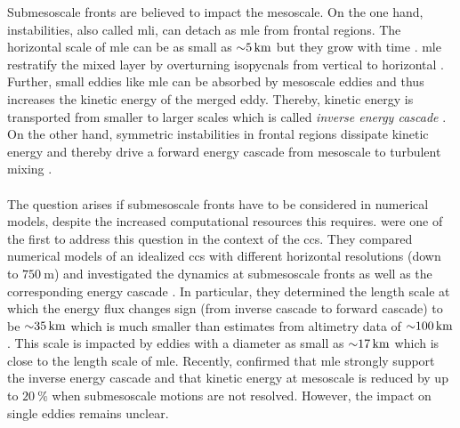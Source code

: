 Submesoscale fronts are believed to impact the mesoscale. On the one hand, instabilities, also called \ac{mli}, can detach as \ac{mle} from frontal regions. The horizontal scale of \ac{mle} can be as small as ${\sim} \SI{5}{\kilo\metre}$ but they grow with time \autocite{boccaletti-2007}. \ac{mle} restratify the mixed layer by overturning isopycnals from vertical to horizontal \autocite{foxkemper-2008-mle-param, levy-2012-physics-to-life, whitt-2017-ml-stratification}. Further, small eddies like \ac{mle} can be absorbed by mesoscale eddies and thus increases the kinetic energy of the merged eddy. Thereby, kinetic energy is transported from smaller to larger scales which is called \textit{inverse energy cascade} \autocite{sasaki-2014-mli-for-eddies, schubert-2020-subm-energy-cascade}. On the other hand, symmetric instabilities in frontal regions dissipate kinetic energy and thereby drive a forward energy cascade from mesoscale to turbulent mixing \autocite{dasaro-subm-dissipation-obs, schubert-2020-subm-energy-cascade}.\\
\\
The question arises if submesoscale fronts have to be considered in numerical models, despite the increased computational resources this requires. \textcite{capet-2008-fronts1} were one of the first to address this question in the context of the \ac{ccs}. They compared numerical models of an idealized \ac{ccs} with different horizontal resolutions (down to $\SI{750}{\metre}$) and investigated the dynamics at submesoscale fronts \autocite{capet-2008-fronts2} as well as the corresponding energy cascade \autocite{capet-2008-fronts3}. In particular, they determined the length scale at which the energy flux changes sign (from inverse cascade to forward cascade) to be ${\sim} \SI{35}{\kilo\metre}$ \autocite{capet-2008-fronts3} which is much smaller than estimates from altimetry data of ${\sim} \SI{100}{\kilo\metre}$ \autocite{tulloch-2011-inverse-altimeter}. This scale is impacted by eddies with a diameter as small as ${\sim} \SI{17}{\kilo\metre}$ \autocite[Appendix B]{schubert-2020-subm-energy-cascade} which is close to the length scale of \ac{mle}. Recently, \textcite{schubert-2020-subm-energy-cascade} confirmed that \ac{mle} strongly support the inverse energy cascade and that kinetic energy at mesoscale is reduced by up to $\SI{20}{\percent}$ when submesoscale motions are not resolved. However, the impact on single eddies remains unclear.\\
\\
